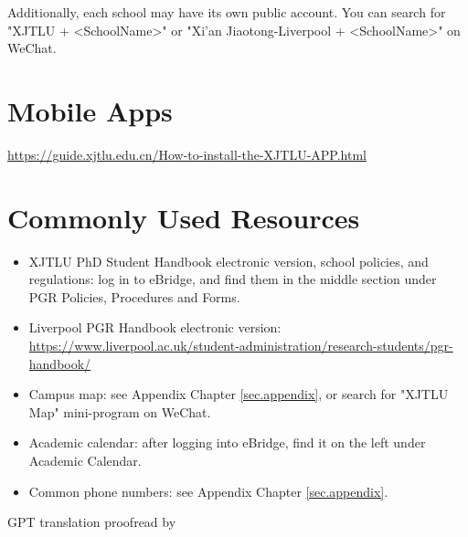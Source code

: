 Additionally, each school may have its own public account. You can search for "XJTLU + <SchoolName>" or "Xi'an Jiaotong-Liverpool + <SchoolName>" on WeChat.

\section{Mobile Apps}
\url{https://guide.xjtlu.edu.cn/How-to-install-the-XJTLU-APP.html}

\section{Commonly Used Resources}
\begin{itemize}
    \item XJTLU PhD Student Handbook electronic version, school policies, and regulations: log in to eBridge, and find them in the middle section under PGR Policies, Procedures and Forms.
    \item Liverpool PGR Handbook electronic version: \url{https://www.liverpool.ac.uk/student-administration/research-students/pgr-handbook/}
    \item Campus map: see Appendix Chapter \ref{sec.appendix}, or search for "XJTLU Map" mini-program on WeChat.
    \item Academic calendar: after logging into eBridge, find it on the left under Academic Calendar.
    \item Common phone numbers: see Appendix Chapter \ref{sec.appendix}.
\end{itemize}

\begin{flushright}
    GPT translation proofread by \Shiyao
\end{flushright}